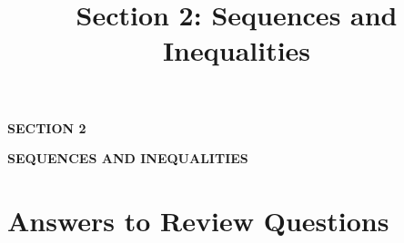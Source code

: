 \documentclass[11pt]{article}
\title{\textbf{Section 2: Sequences and Inequalities}}
\author{}
\date{}
\begin{document}
\begin{titlepage}
\centering
\vspace*{4cm}
{\Huge\bfseries\color{sectionblue} SECTION 2\par}
\vspace{1cm}
{\LARGE\bfseries SEQUENCES AND INEQUALITIES\par}
\end{titlepage}














\clearpage
\section*{Answers to Review Questions}

\end{document}
